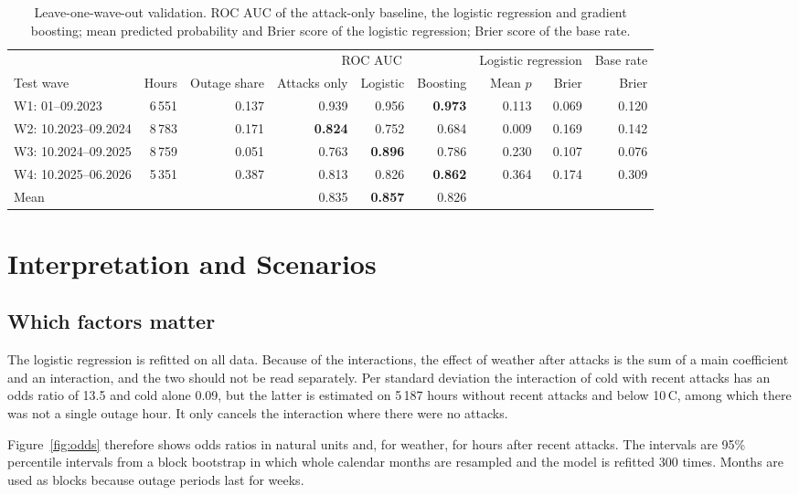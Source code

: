 \documentclass[9pt,twocolumn,letterpaper]{extarticle}
\begin{document}
\begin{table}[t]
\centering\small
\caption{Leave-one-wave-out validation. ROC AUC of the attack-only baseline, the logistic regression and gradient boosting; mean predicted probability and Brier score of the logistic regression; Brier score of the base rate.}
\label{tab:cv}
\begin{tabular}{@{}lrrrrrrrr@{}}
\toprule
 & & & \multicolumn{3}{c}{ROC AUC} & \multicolumn{2}{c}{Logistic regression} & Base rate \\
\cmidrule(lr){4-6}\cmidrule(lr){7-8}\cmidrule(l){9-9}
Test wave & Hours & Outage share & Attacks only & Logistic & Boosting & Mean $p$ & Brier & Brier \\
\midrule
W1: 01--09.2023 & 6\,551 & 0.137 & 0.939 & 0.956 & \textbf{0.973} & 0.113 & 0.069 & 0.120 \\
W2: 10.2023--09.2024 & 8\,783 & 0.171 & \textbf{0.824} & 0.752 & 0.684 & 0.009 & 0.169 & 0.142 \\
W3: 10.2024--09.2025 & 8\,759 & 0.051 & 0.763 & \textbf{0.896} & 0.786 & 0.230 & 0.107 & 0.076 \\
W4: 10.2025--06.2026 & 5\,351 & 0.387 & 0.813 & 0.826 & \textbf{0.862} & 0.364 & 0.174 & 0.309 \\
\midrule
Mean & & & 0.835 & \textbf{0.857} & 0.826 & & & \\
\bottomrule
\end{tabular}
\end{table}

\section{Interpretation and Scenarios}

\subsection{Which factors matter}
The logistic regression is refitted on all data. Because of the interactions, the effect of weather after attacks is the sum of a main coefficient and an interaction, and the two should not be read separately. Per standard deviation the interaction of cold with recent attacks has an odds ratio of 13.5 and cold alone 0.09, but the latter is estimated on 5\,187 hours without recent attacks and below 10\,\textdegree C, among which there was not a single outage hour. It only cancels the interaction where there were no attacks.

Figure~\ref{fig:odds} therefore shows odds ratios in natural units and, for weather, for hours after recent attacks. The intervals are 95\% percentile intervals from a block bootstrap in which whole calendar months are resampled and the model is refitted 300 times. Months are used as blocks because outage periods last for weeks.
\end{document}
